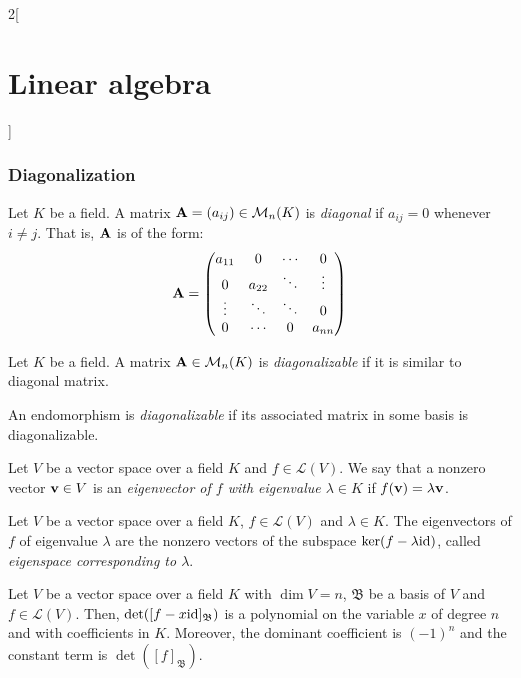 \documentclass[../../../main.tex]{subfiles}
\begin{document}
\begin{multicols}{2}[\section{Linear algebra}]
  \subsubsection{Diagonalization}
  \begin{definition}
    Let $K$ be a field. A matrix $\boldsymbol{\mathrm{A}}=(a_{ij})\in\mathcal{M}_n(K)$ is \textit{diagonal} if $a_{ij}=0$ whenever $i\ne j$. That is, $\boldsymbol{\mathrm{A}}$ is of the form:
    $$\boldsymbol{\mathrm{A}}=
      \begin{pmatrix}
        a_{11} & 0      & \cdots & 0      \\
        0      & a_{22} & \ddots & \vdots \\
        \vdots & \ddots & \ddots & 0      \\
        0      & \cdots & 0      & a_{nn}
      \end{pmatrix}
    $$
  \end{definition}
  \begin{definition}
    Let $K$ be a field. A matrix $\boldsymbol{\mathrm{A}}\in\mathcal{M}_n(K)$ is \textit{diagonalizable} if it is similar to diagonal matrix.
  \end{definition}
  \begin{definition}
    An endomorphism is \textit{diagonalizable} if its associated matrix in some basis is diagonalizable.
  \end{definition}
  \begin{definition}
    Let $V$ be a vector space over a field $K$ and $f\in\mathcal{L}(V)$. We say that a nonzero vector $\boldsymbol{\mathrm{v}}\in V$ is an \textit{eigenvector of $f$ with eigenvalue $\lambda\in K$} if $f(\boldsymbol{\mathrm{v}})=\lambda \boldsymbol{\mathrm{v}}$.
  \end{definition}
  \begin{lemma}
    Let $V$ be a vector space over a field $K$, $f\in\mathcal{L}(V)$ and $\lambda\in K$. The eigenvectors of $f$ of eigenvalue $\lambda$ are the nonzero vectors of the subspace $\ker(f-\lambda\mathrm{id})$, called \textit{eigenspace corresponding to $\lambda$}.
  \end{lemma}
  \begin{lemma}
    Let $V$ be a vector space over a field $K$ with $\dim V=n$, $\mathfrak{B}$ be a basis of $V$ and $f\in\mathcal{L}(V)$. Then, $\det([f-x\mathrm{id}]_\mathfrak{B})$ is a polynomial on the variable $x$ of degree $n$ and with coefficients in $K$. Moreover, the dominant coefficient is $(-1)^n$ and the constant term is $\det([f]_\mathfrak{B})$.
  \end{lemma}

\end{multicols}
\end{document}
